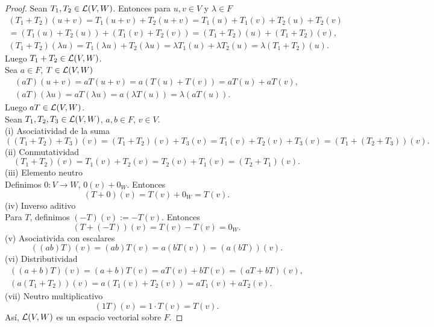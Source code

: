 \documentclass[12pt,a4paper]{article}
\begin{document}
    \begin{proof}
        Sean $T_{1},T_{2}\in\mathcal{L}(V,W)$. Entonces para $u,v\in V$ y $\lambda\in F$
        \begin{align*}
            (T_{1}+T_{2})(u+v)=T_{1}(u+v)+T_{2}(u+v)=T_{1}(u)+T_{1}(v)+T_{2}(u)+T_{2}(v)\\
            =(T_{1}(u)+T_{2}(u))+(T_{1}(v)+T_{2}(v))=(T_{1}+T_{2})(u)+(T_{1}+T_{2})(v),\\
            (T_{1}+T_{2})(\lambda u)=T_{1}(\lambda u)+T_{2}(\lambda u)=\lambda T_{1}(u)+\lambda T_{2}(u)=\lambda(T_{1}+T_{2})(u).
        \end{align*}
        Luego $T_{1}+T_{2}\in\mathcal{L}(V,W)$.\\
        Sea $a\in F$, $T\in\mathcal{L}(V,W)$
        \begin{align*}
            (aT)(u+v)=aT(u+v)=a(T(u)+T(v))=aT(u)+aT(v),\\
            (aT)(\lambda u)=aT(\lambda u)=a(\lambda T(u))=\lambda(aT(u)).
        \end{align*}
        Luego $aT\in\mathcal{L}(V,W)$.\\
        Sean $T_{1},T_{2},T_{3}\in\mathcal{L}(V,W)$, $a,b\in F$, $v\in V$.\\
        (i) Asociatividad de la suma
        \begin{equation*}
            ((T_{1}+T_{2})+T_{3})(v)=(T_{1}+T_{2})(v)+T_{3}(v)=T_{1}(v)+T_{2}(v)+T_{3}(v)=(T_{1}+(T_{2}+T_{3}))(v).
        \end{equation*}
        (ii) Conmutatividad
        \begin{equation*}
            (T_{1}+T_{2})(v)=T_{1}(v)+T_{2}(v)=T_{2}(v)+T_{1}(v)=(T_{2}+T_{1})(v).
        \end{equation*}
        (iii) Elemento neutro\\
        Definimos $0:V\to W$, $0(v)+0_{W}$. Entonces
        \begin{equation*}
            (T+0)(v)=T(v)+0_{W}=T(v).
        \end{equation*}
        (iv) Inverso aditivo\\
        Para $T$, definimos $(-T)(v):=-T(v)$. Entonces
        \begin{equation*}
            (T+(-T))(v)=T(v)-T(v)=0_{W}.
        \end{equation*}
        (v) Asociativida con escalares
        \begin{equation*}
            ((ab)T)(v)=(ab)T(v)=a(bT(v))=(a(bT))(v).
        \end{equation*}
        (vi) Distributividad
        \begin{align*}
            ((a+b)T)(v)=(a+b)T(v)=aT(v)+bT(v)=(aT+bT)(v),\\
            (a(T_{1}+T_{2}))(v)=a(T_{1}(v)+T_{2}(v))=aT_{1}(v)+aT_{2}(v).
        \end{align*}
        (vii) Neutro multiplicativo
        \begin{equation*}
            (1T)(v)=1\cdot T(v)=T(v).
        \end{equation*}
        Así, $\mathcal{L}(V,W)$ es un espacio vectorial sobre $F$.
    \end{proof}
    
\end{document}
